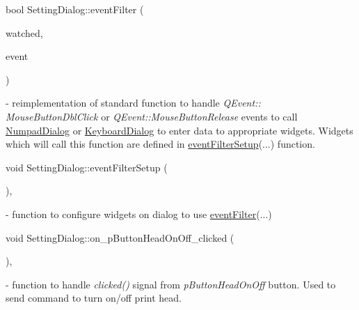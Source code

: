 \mbox{\label{classSettingDialog_aced29131c09a6a91867bd3d6b05f01dc}} 
{\footnotesize\ttfamily bool Setting\+Dialog\+::\texorpdfstring{event\+Filter}{eventFilter} (\begin{DoxyParamCaption}\item[{Q\+Object $\ast$}]{watched,  }\item[{Q\+Event $\ast$}]{event }\end{DoxyParamCaption})\hspace{0.3cm}{\ttfamily [protected]}} - reimplementation of standard function to handle \textit{QEvent:: MouseButtonDblClick} or \textit{QEvent::MouseButtonRelease} events to call \hyperlink{classNumpadDialog}{Numpad\+Dialog} or \hyperlink{classKeyboardDialog}{Keyboard\+Dialog} to enter data to appropriate widgets. Widgets which will call this function are defined in \hyperlink{classSettingDialog_a01d7341608bd80021abd1a5892fdb131}{event\+Filter\+Setup}(...) function. 

\mbox{\label{classSettingDialog_a01d7341608bd80021abd1a5892fdb131}} 
{\footnotesize\ttfamily void Setting\+Dialog\+::\texorpdfstring{event\+Filter\+Setup}{eventFilterSetup} (\begin{DoxyParamCaption}{ }\end{DoxyParamCaption})\hspace{0.3cm}{\ttfamily [private]}, {\ttfamily [slot]}} - function to configure widgets on
dialog to use \hyperlink{classSettingDialog_aced29131c09a6a91867bd3d6b05f01dc}{event\+Filter}(...)

\mbox{\label{classSettingDialog_a0fd7b8d8b9d06ff10dd9136e699cb5f0}} 
{\footnotesize\ttfamily void Setting\+Dialog\+::\texorpdfstring{on\+\_\+p\+Button\+Head\+On\+Off\+\_\+clicked}{on\_pButtonHeadOnOff\_clicked} (\begin{DoxyParamCaption}{ }\end{DoxyParamCaption})\hspace{0.3cm}{\ttfamily [private]}, {\ttfamily [slot]}} - function to handle \textit{clicked()} signal from \textit{p\+Button\+Head\+On\+Off} button. Used to send command to turn on/off print head.

